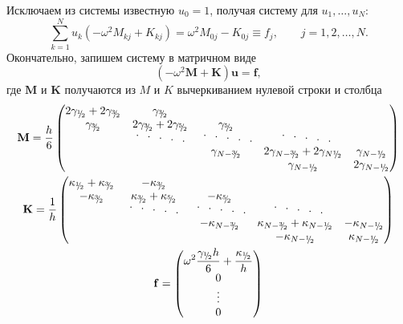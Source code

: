 \documentclass[12pt]{article}
\newcommand{\cutefrac}[2]{{}^{#1\!}\!/{\!}_#2}
\newcommand{\half}{\cutefrac{1}{2}}
\newcommand{\cuteddots}{
\text{
\raisebox{.6ex}{$\cdot$}\hspace{.75em}%
\raisebox{.3ex}{$\cdot$}\hspace{.75em}%
$\cdot$\hspace{.75em}%
\raisebox{-.3ex}{$\cdot$}\hspace{.75em}%
\raisebox{-.6ex}{$\cdot$}%
}}
\begin{document}
Исключаем из системы известную $u_0 = 1$, получая систему для $u_1, \dots, u_N$:
\[
\sum_{k = 1}^N u_k (-\omega^2 M_{kj} + K_{kj}) = \omega^2 M_{0j} - K_{0j} \equiv
f_j, \qquad j = 1, 2, \dots, N.
\]
Окончательно, запишем систему в матричном виде
\begin{equation}
(-\omega^2 \mathbf{M} + \mathbf{K})\mathbf{u} = \mathbf{f},
\label{eq:final}
\end{equation}
где $\mathbf{M}$ и $\mathbf{K}$ получаются из $M$ и $K$ вычеркиванием нулевой
строки и столбца
\begin{gather*}
\mathbf{M} = \frac{h}{6}
\begin{pmatrix}
2\gamma_{\half} + 2\gamma_{\cutefrac{3}{2}} & \gamma_{\cutefrac{3}{2}}\\
\gamma_{\cutefrac{3}{2}} & 2\gamma_{\cutefrac{3}{2}} + 2\gamma_{\cutefrac{5}{2}} & \gamma_{\cutefrac{5}{2}}\\
& \cuteddots\; & \cuteddots & \;\cuteddots \\
& & \gamma_{N - \cutefrac{3}{2}} & 2\gamma_{N - \cutefrac{3}{2}} + 2\gamma_{N
\half} & \gamma_{N-\half}\\
& & & \gamma_{N - \half} & 2\gamma_{N-\half}
\end{pmatrix}
\\
\mathbf{K} = \frac{1}{h}
\begin{pmatrix}
\kappa_{\half} + \kappa_{\cutefrac{3}{2}} & -\kappa_{\cutefrac{3}{2}}\\
-\kappa_{\cutefrac{3}{2}} & \kappa_{\cutefrac{3}{2}} + \kappa_{\cutefrac{5}{2}}
& -\kappa_{\cutefrac{5}{2}}\\
& \cuteddots\; & \cuteddots & \;\cuteddots \\
& & -\kappa_{N - \cutefrac{3}{2}} & \kappa_{N - \cutefrac{3}{2}} + \kappa_{N - \half} & -\kappa_{N-\half}\\
& & & -\kappa_{N - \half} & \kappa_{N-\half}
\end{pmatrix}
\\
\mathbf{f} = 
\begin{pmatrix}
\displaystyle \omega^2 \frac{\gamma_{\half} h}{6} + \frac{\kappa_{\half}}{h} \\
0 \\ \vdots \\ 0
\end{pmatrix}
\end{gather*}
\end{document}
